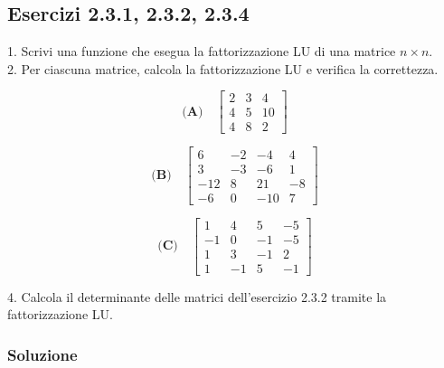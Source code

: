 \documentclass[letterpaper, 12pt]{article}
\numberwithin{equation}{section}    %
\begin{document}
\subsection{Esercizi 2.3.1, 2.3.2, 2.3.4}
1. Scrivi una funzione che esegua la fattorizzazione LU di una matrice $n\times n$.\\
2. Per ciascuna matrice, calcola la fattorizzazione LU e verifica la correttezza.\\
\begin{center}
    \begin{minipage}{0.32\textwidth}
    \centering
    \[
    \textbf{(A)}\quad
    \begin{bmatrix}
    2 & 3 & 4 \\
    4 & 5 & 10 \\
    4 & 8 & 2
    \end{bmatrix}
    \]
    \end{minipage}
    \hfill
    \begin{minipage}{0.32\textwidth}
    \centering
    \[
    \textbf{(B)}\quad
    \begin{bmatrix}
    6 & -2 & -4 & 4\\
    3 & -3 & -6 & 1 \\
    -12 & 8 & 21 & -8 \\
    -6 & 0 & -10 & 7
    \end{bmatrix}
    \]
    \end{minipage}
    \hfill
    \begin{minipage}{0.32\textwidth}
    \centering
    \[
    \textbf{(C)}\quad
    \begin{bmatrix}
    1 & 4 & 5 & -5 \\
    -1 & 0 & -1 & -5 \\
    1 & 3 & -1 & 2 \\
    1 & -1 & 5 & -1 
    \end{bmatrix}
    \]
    \end{minipage}
\end{center}
4. Calcola il determinante delle matrici dell'esercizio 2.3.2 tramite la fattorizzazione LU.
\subsubsection{Soluzione}
\end{document}
